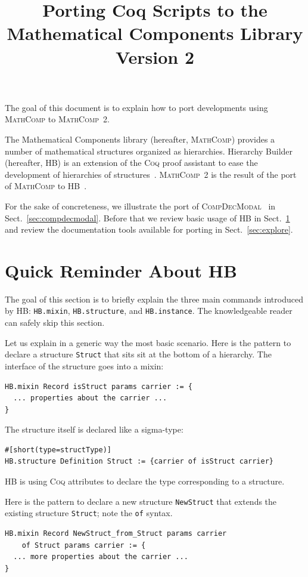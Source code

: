 \documentclass{article}
\title{Porting Coq Scripts to the Mathematical Components Library Version 2}
\def\coq{\textsc{Coq}}
\def\mathcomp{\textsc{MathComp}}
\def\mathcomptwo{\mathcomp~2}
\def\hb{\textsc{HB}}
\def\compdecmodal{\textsc{CompDecModal}}
\def\coqin#1{\texttt{#1}}
\begin{document}
\maketitle

The goal of this document is to explain how to port developments using \mathcomp{}
to \mathcomptwo.

The Mathematical Components library (hereafter, \mathcomp) provides a number
of mathematical structures organized as hierarchies. Hierarchy Builder (hereafter, \hb)
is an extension of the \coq{} proof assistant to ease the development of
hierarchies of structures~\cite{cohen2020fscd}. \mathcomptwo{} is the result
of the port of \mathcomp{} to \hb{}~\cite{mathcomp2021coq}.

For the sake of concreteness, we illustrate the port of
\compdecmodal~\cite{compdecmodal} in Sect.~\ref{sec:compdecmodal}.
Before that we review basic usage of \hb{} in Sect.~\ref{sec:reminder}
and review the documentation tools available for porting in Sect.~\ref{sec:explore}.

\tableofcontents

\section{Quick Reminder About \hb}
\label{sec:reminder}

The goal of this section is to briefly explain the three main commands
introduced by \hb: \coqin{HB.mixin}, \coqin{HB.structure}, and
\coqin{HB.instance}. The knowledgeable reader can safely skip this
section.

Let us explain in a generic way the most basic scenario.
Here is the pattern to declare a structure \coqin{Struct} that sits
sit at the bottom of a hierarchy.  The interface of the structure goes
into a mixin:
\begin{verbatim}
HB.mixin Record isStruct params carrier := {
  ... properties about the carrier ...
}
\end{verbatim}

The structure itself is declared like a sigma-type:
\begin{verbatim}
#[short(type=structType)]
HB.structure Definition Struct := {carrier of isStruct carrier}
\end{verbatim}
\hb{} is using \coq{} attributes to declare the type corresponding to a structure.

Here is the pattern to declare a new structure \coqin{NewStruct} that
extends the existing structure \coqin{Struct}; note the \coqin{of} syntax.
\begin{verbatim}
HB.mixin Record NewStruct_from_Struct params carrier
    of Struct params carrier := {
  ... more properties about the carrier ...
}
\end{verbatim}
\end{document}
